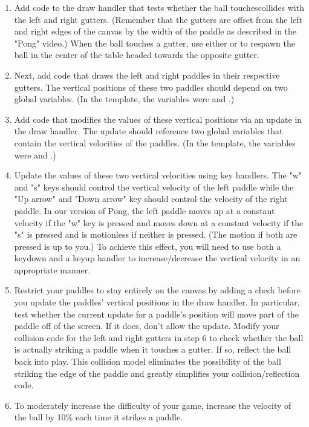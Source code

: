 \documentclass[a4paper,10pt]{article}
\begin{document}
\begin{CJK}{UTF8}{gkai}
\begin{enumerate}
\item Add code to the draw handler that tests whether the ball touches\/collides with the left and right gutters. (Remember that the gutters are offset from the left and right edges of the canvas by the width of the paddle as described in the "Pong" video.) When the ball touches a gutter, use either {\color{red}{spawn\_ball(LEFT)}} or {\color{red}{spawn\_ball(RIGHT)}}to respawn the ball in the center of the table headed towards the opposite gutter.

\item Next, add code that draws the left and right paddles in their respective gutters. The vertical positions of these two paddles should depend on two global variables. (In the template, the variables were {\color{red}{paddle1\_pos}} and {\color{red}{paddle2\_pos}}.)

\item Add code that modifies the values of these vertical positions via an update in the draw handler.  The update should reference two global variables that contain the vertical velocities of the paddles. (In the template, the variables were {\color{red}{paddle1\_vel}} and {\color{red}{paddle2\_vel}}.)

\item Update the values of these two vertical velocities using key handlers. The "w" and "s" keys should control the vertical velocity of the left paddle while the "Up arrow" and "Down arrow" key should control the velocity of the right paddle. In our version of Pong, the left paddle moves up at a constant velocity if the "w" key is pressed and moves down at a constant velocity if the "s" is pressed and is motionless if neither is pressed. (The motion if both are pressed is up to you.) To achieve this effect, you will need to use both a keydown and a keyup handler to increase/decrease the vertical velocity in an appropriate manner.

\item Restrict your paddles to stay entirely on the canvas by adding a check before you update the paddles' vertical positions in the draw handler. In particular, test whether the current update for a paddle's position will move part of the paddle off of the screen. If it does, don't allow the update.
Modify your collision code for the left and right gutters in step 6 to check whether the ball is actually striking a paddle when it touches a gutter. If so, reflect the ball back into play. This collision model eliminates the possibility of the ball striking the edge of the paddle and greatly simplifies your collision/reflection code.
\item To moderately increase the difficulty of your game, increase the velocity of the ball by 10\% each time it strikes a paddle.


\end{enumerate}
\end{CJK}
\end{document}
